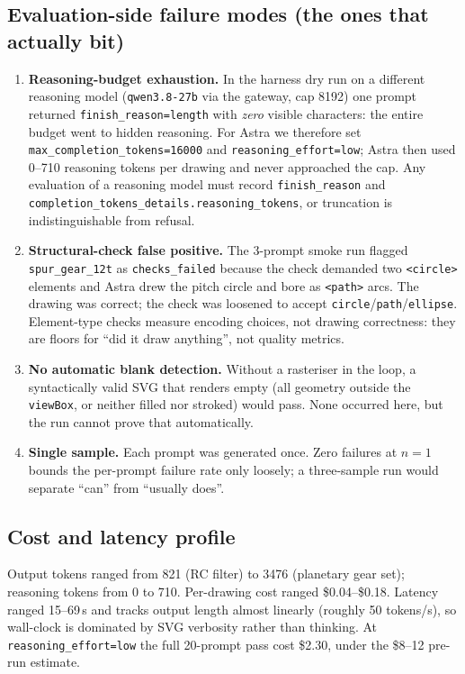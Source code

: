 \documentclass[11pt,a4paper]{article}
\begin{document}
\subsection{Evaluation-side failure modes (the ones that actually bit)}
\begin{enumerate}
  \item \textbf{Reasoning-budget exhaustion.} In the harness dry run on a different reasoning model (\texttt{qwen3.8-27b} via the gateway, cap 8192) one prompt returned \texttt{finish\_reason=length} with \emph{zero} visible characters: the entire budget went to hidden reasoning. For Astra we therefore set \texttt{max\_completion\_tokens=16000} and \texttt{reasoning\_effort=low}; Astra then used 0--710 reasoning tokens per drawing and never approached the cap. Any evaluation of a reasoning model must record \texttt{finish\_reason} and \texttt{completion\_tokens\_details.reasoning\_tokens}, or truncation is indistinguishable from refusal.
  \item \textbf{Structural-check false positive.} The 3-prompt smoke run flagged \texttt{spur\_gear\_12t} as \texttt{checks\_failed} because the check demanded two \texttt{<circle>} elements and Astra drew the pitch circle and bore as \texttt{<path>} arcs. The drawing was correct; the check was loosened to accept \texttt{circle}/\texttt{path}/\texttt{ellipse}. Element-type checks measure encoding choices, not drawing correctness: they are floors for ``did it draw anything'', not quality metrics.
  \item \textbf{No automatic blank detection.} Without a rasteriser in the loop, a syntactically valid SVG that renders empty (all geometry outside the \texttt{viewBox}, or neither filled nor stroked) would pass. None occurred here, but the run cannot prove that automatically.
  \item \textbf{Single sample.} Each prompt was generated once. Zero failures at $n=1$ bounds the per-prompt failure rate only loosely; a three-sample run would separate ``can'' from ``usually does''.
\end{enumerate}

\subsection{Cost and latency profile}
Output tokens ranged from 821 (RC filter) to 3476 (planetary gear set); reasoning tokens from 0 to 710. Per-drawing cost ranged \$0.04--\$0.18. Latency ranged 15--69\,s and tracks output length almost linearly (roughly 50 tokens/s), so wall-clock is dominated by SVG verbosity rather than thinking. At \texttt{reasoning\_effort=low} the full 20-prompt pass cost \$2.30, under the \$8--12 pre-run estimate.
\end{document}
